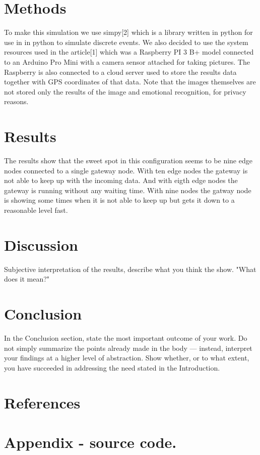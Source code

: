 \documentclass[a4paper,11pt,notitlepage,twocolumn]{article}
\begin{document}
  \section{Methods}
    To make this simulation we use simpy[2] which is a library written in python for use in
    in python to simulate discrete events. We also decided to use the system resources used
    in the article[1] which was a Raspberry PI 3 B+ model connected to an Arduino Pro Mini
    with a camera sensor attached for taking pictures. The Raspberry is also connected to a
    cloud server used to store the results data together with GPS coordinates of that data.
    Note that the images themselves are not stored only the results of the image and
    emotional recognition, for privacy reasons.
  
  \section{Results}
    The results show that the sweet spot in this configuration seems to be nine edge nodes
    connected to a single gateway node. With ten edge nodes the gateway is not able to keep
    up with the incoming data. And with eigth edge nodes the gateway is running without any
    waiting time. With nine nodes the gatway node is showing some times when it is not able
    to keep up but gets it down to a reasonable level fast.
    
  \section{Discussion}
    Subjective interpretation of the results, describe what you think the show.
    "What does it mean?"
    
  \section{Conclusion}
    In the Conclusion section, state the most important outcome of your work. Do not simply
    summarize the points already made in the body — instead, interpret your findings at a
    higher level of abstraction. Show whether, or to what extent, you have succeeded in
    addressing the need stated in the Introduction.
    
  \section{References}
    

  \onecolumn
  \section{Appendix - source code.}
\end{document}
